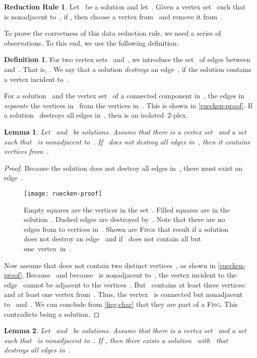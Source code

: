 \documentclass[12pt, a4paper, abstracton]{scrreprt}
\newcommand{\FISG}{\textsc{Fisg}}
\newcounter{theorem}
\newtheorem{lemma}{Lemma}[chapter]
\theoremstyle{definition}
\newtheorem{rul}{Reduction Rule}[chapter]
\newtheorem{definition}{Definition}[chapter]
\theoremstyle{remark}
\begin{document}
\begin{rul}\label{ruecken}
  Let~ be a solution and let~. Given a vertex set~
  such that~ is nonadjacent
  to~, if , then choose
  a vertex from~ and remove it from~.
\end{rul}

\noindent To prove the correctness of this data reduction rule, we need a series of observations. To this end, we use the following definition:

\begin{definition}
  For two vertex sets~ and~, we introduce the set~ of edges between~ and~. That is, .  We say that a solution \emph{destroys} an edge~, if the solution contains a vertex incident to~.
\end{definition}

\noindent For a solution~ and the vertex set~ of a connected component in~, the edges in~ \emph{separate} the vertices in~ from the vertices in~. This is shown in \autoref{ruecken-proof}. If a solution~ destroys all edges in~, then  is an isolated~2-plex.

\begin{lemma}\label{ruecken-lemma}
  Let~ and~ be solutions. Assume that there is a vertex set~
  and a set~ such that~ is nonadjacent
  to~. If~ does not destroy all edges in~, then it
  contains~ vertices from~.
\end{lemma}
\begin{proof}
  Because the solution  does not destroy all edges in~,
  there must exist an edge~.
\begin{figure}
  \centering
  \texttt{[image: ruecken-proof]}
  \caption{Empty squares are the vertices in the set~. Filled squares are in the solution~. Dashed edges are destroyed by~. Note that there are no edges from  to vertices in~. Shown are \FISG{}s that result if a solution~ does not destroy an edge~ and if~ does not contain all but one~vertex~in~.}
\label{ruecken-proof}
\end{figure}
Now assume that  does not contain two distinct
  vertices~, as shown in
  \autoref{ruecken-proof}. Because~ and because~ is
  nonadjacent to~, the vertex  incident to the
  edge~ cannot be adjacent to the vertices~.  But~ contains at least
  three vertices:~ and at least one vertex from~. Thus,
  the vertex ~is connected but nonadjacent to~ and~. We can
  conclude from \autoref{fisg-char} that they are part of a
  \FISG{}. This contradicts  being a solution.
\end{proof}

\begin{lemma}\label{exist-sol}
  Let~ and~ be solutions.  Assume that there is a vertex set~
  and a set~ such that~ is nonadjacent
  to~. If , then there exists a solution~
  with~ that destroys all edges in~.
\end{lemma}
\end{document}
